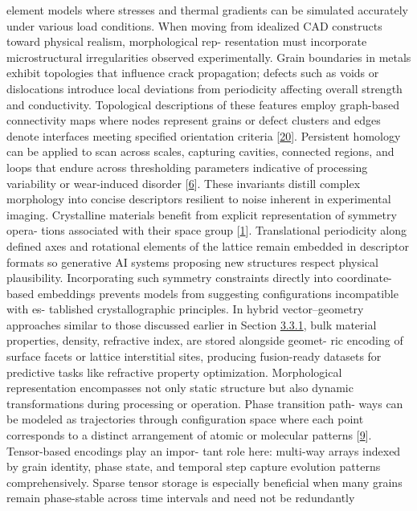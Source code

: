 \documentclass[
]{article}
\begin{document}
element models where stresses and thermal gradients can be simulated
accurately under various load conditions. When moving from idealized CAD
constructs toward physical realism, morphological rep- resentation must
incorporate microstructural irregularities observed experimentally.
Grain boundaries in metals exhibit topologies that influence crack
propagation; defects such as voids or dislocations introduce local
deviations from periodicity affecting overall strength and conductivity.
Topological descriptions of these features employ graph-based
connectivity maps where nodes represent grains or defect clusters and
edges denote interfaces meeting specified orientation criteria
{[}\hyperref[_bookmark60]{20}{]}. Persistent homology can be applied to
scan across scales, capturing cavities, connected regions, and loops
that endure across thresholding parameters indicative of processing
variability or wear-induced disorder {[}\hyperref[_bookmark46]{6}{]}.
These invariants distill complex morphology into concise descriptors
resilient to noise inherent in experimental imaging. Crystalline
materials benefit from explicit representation of symmetry opera- tions
associated with their space group {[}\hyperref[_bookmark41]{1}{]}.
Translational periodicity along defined axes and rotational elements of
the lattice remain embedded in descriptor formats so generative AI
systems proposing new structures respect physical plausibility.
Incorporating such symmetry constraints directly into coordinate-based
embeddings prevents models from suggesting configurations incompatible
with es- tablished crystallographic principles. In hybrid
vector--geometry approaches similar to those discussed earlier in
Section
\hyperref[combining-geometric-and-vector-representations]{3.3.1}, bulk
material properties, density, refractive index, are stored alongside
geomet- ric encoding of surface facets or lattice interstitial sites,
producing fusion-ready datasets for predictive tasks like refractive
property optimization. Morphological representation encompasses not only
static structure but also dynamic transformations during processing or
operation. Phase transition path- ways can be modeled as trajectories
through configuration space where each point corresponds to a distinct
arrangement of atomic or molecular patterns
{[}\hyperref[_bookmark49]{9}{]}. Tensor-based encodings play an impor-
tant role here: multi-way arrays indexed by grain identity, phase state,
and temporal step capture evolution patterns comprehensively. Sparse
tensor storage is especially beneficial when many grains remain
phase-stable across time intervals and need not be redundantly
\end{document}
